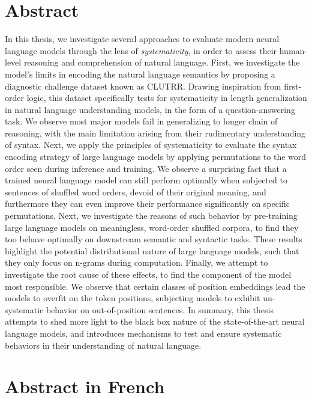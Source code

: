 \documentclass[letterpaper, 12pt]{report}
\begin{document}
\chapter*{Abstract}
\label{sec:abstract_en}

In this thesis, we investigate several approaches to evaluate modern neural language models through the lens of \textit{systematicity}, in order to assess their human-level reasoning and comprehension of natural language. First, we investigate the model's limits in encoding the natural language semantics by proposing a diagnostic challenge dataset known as CLUTRR. Drawing inspiration from first-order logic, this dataset specifically tests for systematicity in length generalization in natural language understanding models, in the form of a question-answering task. We observe most major models fail in generalizing to longer chain of reasoning, with the main limitation arising from their rudimentary understanding of syntax. Next, we apply the principles of systematicity to evaluate the syntax encoding strategy of large language models by applying permutations to the word order seen during inference and training. We observe a surprising fact that a trained neural language model can still perform optimally when subjected to sentences of shuffled word orders, devoid of their original meaning, and furthermore they can even improve their performance significantly on specific permutations. Next, we investigate the reasons of such behavior by pre-training large language models on meaningless, word-order shuffled corpora, to find they too behave optimally on downstream semantic and syntactic tasks. These results highlight the potential distributional nature of large language models, such that they only focus on n-grams during computation. Finally, we attempt to investigate the root cause of these effects, to find the component of the model most responsible. We observe that certain classes of position embeddings lead the models to overfit on the token positions, subjecting models to exhibit un-systematic behavior on out-of-position sentences. In summary, this thesis attempts to shed more light to the black box nature of the state-of-the-art neural language models, and introduces mechanisms to test and ensure systematic behaviors in their understanding of natural language.

\chapter*{Abstract in French}
\label{sec:abstract_fr}
\end{document}
